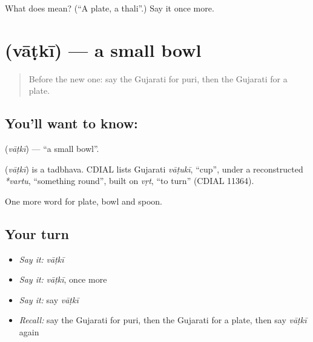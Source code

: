 \begin{tcolorbox}[breakable,colback=teal!4,colframe=teal!35!black,title={Before you move on}]
What does  mean? (\textquotedblleft{}A plate, a thali\textquotedblright{}.) Say it once more.
\end{tcolorbox}
\section[\texorpdfstring{\gu{વાટકી} (vāṭkī)}{વાટકી (vāṭkī)}]{ (vāṭkī) — a small bowl}

\label{lesson:GU-C61-bowl}



\begin{quote}
Before the new one: say the Gujarati for puri, then the Gujarati for a plate.
\end{quote}

\subsection*{You'll want to know: }
\textbf{} (\emph{vāṭkī}) — \textquotedblleft{}a small bowl\textquotedblright{}.

\begin{cousinweb}
\textbf{} (\emph{vāṭkī}) is a tadbhava. CDIAL lists Gujarati \emph{vāṭukī}, \textquotedblleft{}cup\textquotedblright{}, under a reconstructed \emph{*vartu}, \textquotedblleft{}something round\textquotedblright{}, built on \emph{vṛt}, \textquotedblleft{}to turn\textquotedblright{} (CDIAL 11364).
\end{cousinweb}

\begin{grammarlens}[title={What you've built}]
One more word for plate, bowl and spoon.
\end{grammarlens}

\subsection*{Your turn}
\begin{itemize}
\raggedright
  \item \emph{Say it:} \emph{vāṭkī}
  \item \emph{Say it:} \emph{vāṭkī}, once more
  \item \emph{Say it:} say \emph{vāṭkī}
  \item \emph{Recall:} say the Gujarati for puri, then the Gujarati for a plate, then say \emph{vāṭkī} again
\end{itemize}

